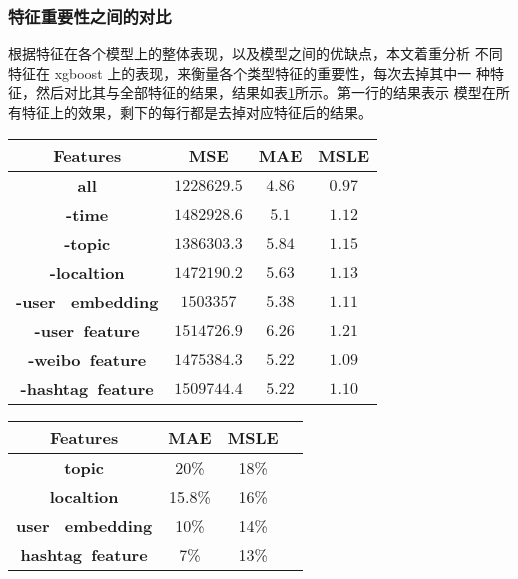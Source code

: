 \subsubsection{特征重要性之间的对比}
根据特征在各个模型上的整体表现，以及模型之间的优缺点，本文着重分析 不同特征在 xgboost 上的表现，来衡量各个类型特征的重要性，每次去掉其中一 种特征，然后对比其与全部特征的结果，结果如表\ref{tab:3_6}所示。第一行的结果表示 模型在所有特征上的效果，剩下的每行都是去掉对应特征后的结果。


\begin{table}[H]
    \centering
    \footnotesize%
      \label{tab:3_6}
    \setlength{\tabcolsep}{15pt}%
    \renewcommand{\arraystretch}{1.2}%
    \begin{tabular}{cccc}
        \hline
       \textbf{ Features} & \textbf{MSE }& \textbf{MAE }& \textbf{MSLE}  \\
        \hline
         \textbf{all} & $1228629.5$ & $4.86$ & $0.97$  \\
		 \textbf{-time} & $1482928.6$ & $5.1$ & $1.12$  \\
         \textbf{-topic }& $1386303.3$ & $5.84$ & $1.15$  \\
         \textbf{-localtion} & $1472190.2$ & $5.63$ & $1.13$  \\
         \textbf{-user ~embedding} & $1503357$ & $5.38$ & $1.11$  \\
        \textbf{-user~feature }& $1514726.9$ & $6.26$ & $1.21$  \\
         \textbf{-weibo~feature} & $1475384.3$ & $5.22$ & $1.09$  \\
         \textbf{-hashtag~feature} & $1509744.4$ & $5.22$ & $1.10$  \\
        	\hline
    \end{tabular}
     
\end{table}


\begin{table}[H]
    \centering
    \footnotesize%
      \label{tab:3_6_1}
    \setlength{\tabcolsep}{15pt}%
    \renewcommand{\arraystretch}{1.2}%
    \begin{tabular}{cccc}
        \hline
        \textbf{Features} &  \textbf{MAE} &\textbf{ MSLE}  \\
        \hline
        
        \textbf{ topic }  & 20\% & 18\%  \\
         \textbf{localtion} & 15.8\% & 16\%  \\
         \textbf{user ~embedding}  & 10\% & 14\%  \\
         \textbf{hashtag~feature} & 7\% & 13\%  \\
        	\hline
    \end{tabular}

\end{table}


